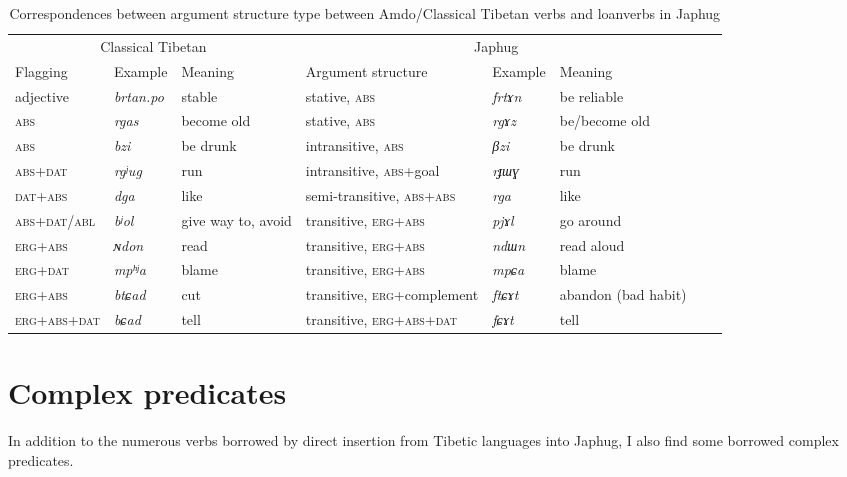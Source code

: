 \documentclass[oneside,a4paper,11pt]{article}
\newcommand{\ipa}[1]{{\phon\textit{\mbox{#1}}}} %
\begin{document}
\begin{landscape}

 

\begin{table}[H]
\caption{Correspondences between argument structure type between Amdo/Classical Tibetan verbs and loanverbs in Japhug} \label{ex:correspondences}
\begin{tabular}{llllllll}
\toprule
 \multicolumn{3}{c}{Classical Tibetan}  & \multicolumn{3}{c}{Japhug}&&\\
Flagging & Example & Meaning & Argument structure & Example & Meaning & \\
\midrule
adjective & \ipa{brtan.po} &stable&  stative, \textsc{abs} & \ipa{frtɤn} &be reliable& \\
 \textsc{abs} &  \ipa{rgas} & become old &stative, \textsc{abs} & \ipa{rgɤz} & be/become old \\
 \textsc{abs} &  \ipa{bzi} & be drunk &intransitive, \textsc{abs} & \ipa{βzi} & be drunk \\
 \textsc{abs+dat} &  \ipa{rgʲug} &run &intransitive, \textsc{abs}+goal  & \ipa{rɟɯɣ} & run \\
\textsc{dat+abs} & \ipa{dga} & like & semi-transitive, \textsc{abs+abs}& \ipa{rga} & like \\
\midrule
 \textsc{abs+dat/abl} &  \ipa{bʲol} & give way to, avoid &transitive, \textsc{erg+abs}& \ipa{pjɤl} & go around \\
\textsc{erg+abs} & \ipa{ɴdon} & read & transitive, \textsc{erg+abs} & \ipa{ndɯn} & read aloud \\

\textsc{erg+dat} & \ipa{mpʰʲa} & blame & transitive, \textsc{erg+abs}& \ipa{mpɕa} & blame \\
\textsc{erg+abs} & \ipa{btɕad} & cut & transitive, \textsc{erg+}complement & \ipa{ftɕɤt} & abandon (bad habit) \\
\bottomrule
\textsc{erg+abs+dat} & \ipa{bɕad} & tell & transitive, \textsc{erg+abs+dat}& \ipa{fɕɤt} & tell \\
\bottomrule
\end{tabular}%
\end{table}  
\end{landscape}

  \section{Complex predicates}  
In addition to the numerous verbs borrowed by direct insertion from Tibetic languages into Japhug, I also find some borrowed complex predicates.
\end{document}
